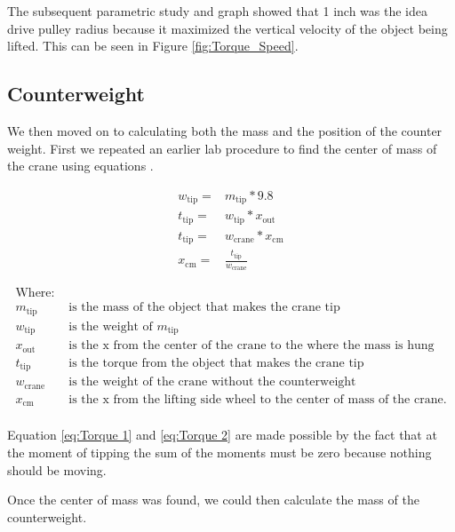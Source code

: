 \documentclass[letterpaper, 12pt]{article}
\begin{document}
The subsequent parametric study and graph showed that 1 inch was the idea drive pulley radius because it maximized the vertical velocity of the object being lifted.  This can be seen in Figure \ref{fig:Torque_Speed}.

\subsection{Counterweight}
\label{sec:Counterweight}
We then moved on to calculating both the mass and the position of the counter weight. 
First we repeated an earlier lab procedure to find the center of mass of the crane using equations    . 

\begin{align}
        w_{\text{tip}}= & m_{\text{tip}} * 9.8 \\
        t_{\text{tip}}= & w_{\text{tip}}*x_{\text{out}}\label{eq:Torque 1} \\ 
        t_{\text{tip}}= & w_{\text{crane}}*x_{\text{cm}}\label{eq:Torque 2} \\
        x_{\text{cm}}= & \frac{t_{\text{tip}}}{w_{\text{crane}}}
\end{align}

\begin{equation}
    \begin{split}
        \text{Where:} \\
        m_{\text{tip}} & \text{ is the mass of the object that makes the crane tip} \\
        w_{\text{tip}} & \text{ is the weight of } m_{\text{tip}} \\
        x_{\text{out}} & \text{ is the x from the center of the crane to the where the mass is hung} \\
        t_{\text{tip}} & \text{ is the torque from the object that makes the crane tip} \\
        w_{\text{crane}} & \text{ is the weight of the crane without the counterweight} \\
        x_{\text{cm}} & \text{ is the x from the lifting side wheel to the center of mass of the crane.} \\
    \end{split}
\end{equation}

Equation \ref{eq:Torque 1} and \ref{eq:Torque 2} are made possible by the fact that at the moment of tipping the sum of the moments must be zero because nothing should be moving. 

Once the center of mass was found, we could then calculate the mass of the counterweight. 
\end{document}
